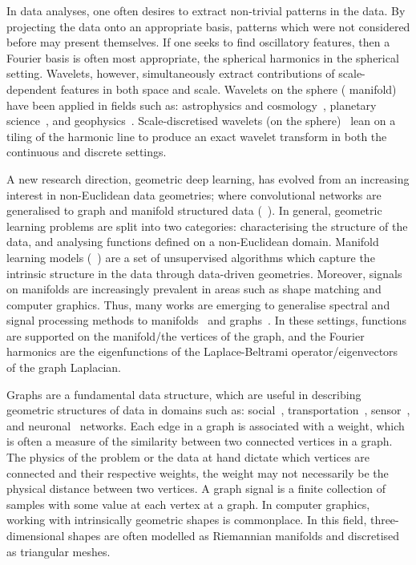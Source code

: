 In data analyses, one often desires to extract non-trivial patterns in the data.
By projecting the data onto an appropriate basis, patterns which were not considered before may present themselves.
If one seeks to find oscillatory features, then a Fourier basis is often most appropriate, \ie{} the spherical harmonics in the spherical setting.
Wavelets, however, simultaneously extract contributions of scale-dependent features in both space and scale.
Wavelets on the sphere (\cf{} manifold) have been applied in fields such as: astrophysics and cosmology~\cite{Pen1999,Barreiro2001,Rocha2004,McEwen2004}, planetary science~\cite{Audet2011,Audet2014}, and geophysics~\cite{Loris2010,Simons2011,Simons2011b}.
Scale-discretised wavelets (on the sphere)~\cite{Wiaux2008,McEwen2018,Leistedt2013,McEwen2013,McEwen2015} lean on a tiling of the harmonic line to produce an exact wavelet transform in both the continuous and discrete settings.

A new research direction, geometric deep learning, has evolved from an increasing interest in non-Euclidean data geometries; where convolutional networks are generalised to graph and manifold structured data (\eg{}~\cite{Bronstein2017,Perlmutter2020}).
In general, geometric learning problems are split into two categories: characterising the structure of the data, and analysing functions defined on a non-Euclidean domain.
Manifold learning models (\eg{}~\cite{Tenenbaum2000,Coifman2006b,VanDerMaaten2008}) are a set of unsupervised algorithms which capture the intrinsic structure in the data through data-driven geometries.
Moreover, signals on manifolds are increasingly prevalent in areas such as shape matching and computer graphics.
Thus, many works are emerging to generalise spectral and signal processing methods to manifolds~\cite{Coifman2006} and graphs~\cite{Shuman2013}.
In these settings, functions are supported on the manifold/the vertices of the graph, and the Fourier harmonics are the eigenfunctions of the Laplace-Beltrami operator/eigenvectors of the graph Laplacian.

Graphs are a fundamental data structure, which are useful in describing geometric structures of data in domains such as: social~\cite{Nettleton2013}, transportation~\cite{Mohan2014}, sensor~\cite{Kenniche2010}, and neuronal~\cite{Tang2012} networks.
Each edge in a graph is associated with a weight, which is often a measure of the similarity between two connected vertices in a graph.
The physics of the problem or the data at hand dictate which vertices are connected and their respective weights, \ie{} the weight may not necessarily be the physical distance between two vertices.
A graph signal is a finite collection of samples with some value at each vertex at a graph.
In computer graphics, working with intrinsically geometric shapes is commonplace.
In this field, three-dimensional shapes are often modelled as Riemannian manifolds and discretised as triangular meshes.

